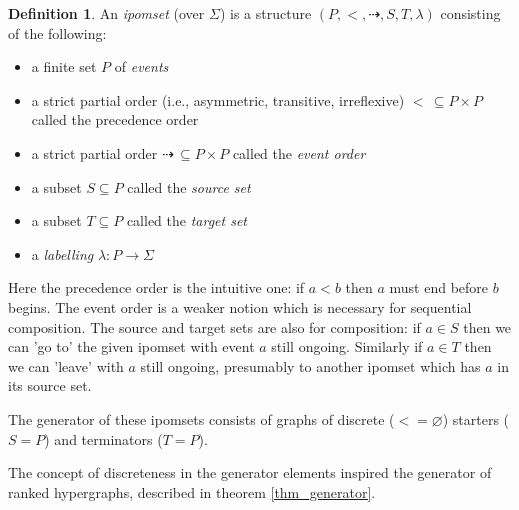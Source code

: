 \documentclass[12pt]{article}
\theoremstyle{definition}
\newtheorem{definition}[theorem]{Definition}
\newcommand{\1}{\mathbbm{1}}
\begin{document}
\begin{definition}
    An \emph{ipomset} (over $\Sigma$) is a structure $(P, <, \dashrightarrow, S, T, \lambda)$ consisting of the following:
    \begin{itemize}
        \item a finite set $P$ of \emph{events}
        \item a strict partial order (i.e., asymmetric, transitive, irreflexive) $<\, \subseteq P\times P$ called the precedence order
        \item a strict partial order $\dashrightarrow\,\subseteq P\times P$ called the \emph{event order}
        \item a subset $S\subseteq P$ called the \emph{source set}
        \item a subset $T\subseteq P$ called the \emph{target set}
        \item a \emph{labelling} $\lambda: P\to \Sigma$
    \end{itemize}
\end{definition}

Here the precedence order is the intuitive one: if $a<b$ then $a$ must end before $b$ begins. The event order is a weaker notion which is necessary for sequential composition. The source and target sets are also for composition: if $a\in S$ then we can 'go to' the given ipomset with event $a$ still ongoing. Similarly if $a\in T$ then we can 'leave' with $a$ still ongoing, presumably to another ipomset which has $a$ in its source set.

The generator of these ipomsets consists of graphs of discrete ($< = \varnothing$) starters ($S = P$) and terminators ($T = P$).

The concept of discreteness in the generator elements inspired the generator of ranked hypergraphs, described in theorem \ref{thm_generator}.
\end{document}
